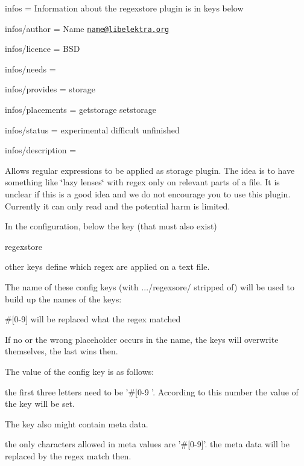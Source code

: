 
\begin{DoxyItemize}
\item infos = Information about the regexstore plugin is in keys below
\item infos/author = Name \href{mailto:name@libelektra.org}{\tt name@libelektra.\+org}
\item infos/licence = B\+S\+D
\item infos/needs =
\item infos/provides = storage
\item infos/placements = getstorage setstorage
\item infos/status = experimental difficult unfinished
\item infos/description =
\end{DoxyItemize}

Allows regular expressions to be applied as storage plugin. The idea is to have something like \char`\"{}lazy lenses\char`\"{} with regex only on relevant parts of a file. It is unclear if this is a good idea and we do not encourage you to use this plugin. Currently it can only read and the potential harm is limited.

In the configuration, below the key (that must also exist) \begin{DoxyVerb}regexstore
\end{DoxyVerb}


other keys define which regex are applied on a text file.

The name of these config keys (with .../regexsore/ stripped of) will be used to build up the names of the keys\+:
\begin{DoxyItemize}
\item \#\mbox{[}0-\/9\mbox{]} will be replaced what the regex matched
\item If no or the wrong placeholder occurs in the name, the keys will overwrite themselves, the last wins then.
\end{DoxyItemize}

The value of the config key is as follows\+:
\begin{DoxyItemize}
\item the first three letters need to be '\#\mbox{[}0-\/9 '. According to this number the value of the key will be set.
\end{DoxyItemize}

The key also might contain meta data.
\begin{DoxyItemize}
\item the only characters allowed in meta values are '\#\mbox{[}0-\/9\mbox{]}'. the meta data will be replaced by the regex match then.
\end{DoxyItemize}


